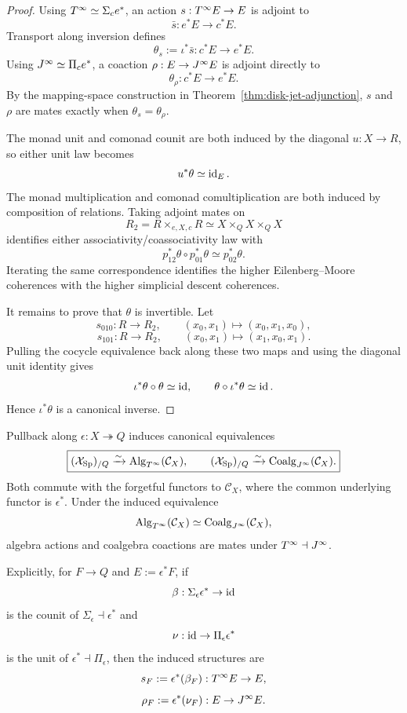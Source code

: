 \begin{proof}
Using $T^{\infty}\simeq\Sigma_ce^*$, an action $s:T^{\infty} E\to E$ is adjoint to
\[
    \bar s:e^*E\longrightarrow c^*E.
\]
Transport along inversion defines
\[
    \theta_s:=\iota^*\bar s:c^*E\longrightarrow e^*E.
\]
Using $J^{\infty}\simeq\Pi_ce^*$, a coaction $\rho:E\to J^{\infty} E$ is adjoint directly to
\[
    \theta_\rho:c^*E\longrightarrow e^*E.
\]
By the mapping-space construction in Theorem~\ref{thm:disk-jet-adjunction}, $s$ and $\rho$ are mates exactly when $\theta_s=\theta_\rho$.

The monad unit and comonad counit are both induced by the diagonal $u:X\to R$, so either unit law becomes
\[
    u^*\theta\simeq\operatorname{id}_E.
\]
The monad multiplication and comonad comultiplication are both induced by composition of relations.  Taking adjoint mates on
\[
    R_2=R\times_{e,X,c}R\simeq X\times_QX\times_QX
\]
identifies either associativity/coassociativity law with
\[
    p_{12}^*\theta\circ p_{01}^*\theta\simeq p_{02}^*\theta.
\]
Iterating the same correspondence identifies the higher Eilenberg--Moore coherences with the higher simplicial descent coherences.

It remains to prove that $\theta$ is invertible.  Let
\[
    s_{010}:R\to R_2,
    \qquad
    (x_0,x_1)\longmapsto(x_0,x_1,x_0),
\]
\[
    s_{101}:R\to R_2,
    \qquad
    (x_0,x_1)\longmapsto(x_1,x_0,x_1).
\]
Pulling the cocycle equivalence back along these two maps and using the diagonal unit identity gives
\[
    \iota^*\theta\circ\theta\simeq\operatorname{id},
    \qquad
    \theta\circ\iota^*\theta\simeq\operatorname{id}.
\]
Hence $\iota^*\theta$ is a canonical inverse.
\end{proof}

\begin{theorem}
\label{thm:jet-em-effective-descent}
\label{thm:jet-effective-descent}
Pullback along $\epsilon:X\twoheadrightarrow Q$ induces canonical equivalences
\[
\boxed{
    (\mathcal{X}_{\mathrm{Sp}})_{/Q}
    \xrightarrow{\sim}
    \operatorname{Alg}_{T^{\infty}}(\mathcal C_X),
    \qquad
    (\mathcal{X}_{\mathrm{Sp}})_{/Q}
    \xrightarrow{\sim}
    \operatorname{Coalg}_{J^{\infty}}(\mathcal C_X).
}
\]
Both commute with the forgetful functors to $\mathcal C_X$, where the common underlying functor is $\epsilon^*$.  Under the induced equivalence
\[
    \operatorname{Alg}_{T^{\infty}}(\mathcal C_X)
    \simeq
    \operatorname{Coalg}_{J^{\infty}}(\mathcal C_X),
\]
algebra actions and coalgebra coactions are mates under $T^{\infty}\dashv J^{\infty}$.

Explicitly, for $F\to Q$ and $E:=\epsilon^*F$, if
\[
    \beta:\Sigma_\epsilon\epsilon^*\to\operatorname{id}
\]
is the counit of $\Sigma_\epsilon\dashv\epsilon^*$ and
\[
    \nu:\operatorname{id}\to\Pi_\epsilon\epsilon^*
\]
is the unit of $\epsilon^*\dashv\Pi_\epsilon$, then the induced structures are
\[
    s_F:=\epsilon^*(\beta_F):T^{\infty} E\to E,
\]
\[
    \rho_F:=\epsilon^*(\nu_F):E\to J^{\infty} E.
\]
\end{theorem}

